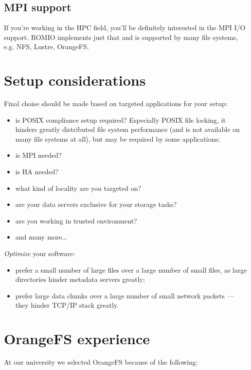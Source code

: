 \documentclass[10pt, a5paper]{article}
\begin{document}
{\subsection*{MPI support}

If you're working in the HPC\cite{bib9} field, you'll be definitely interested in the MPI\cite{bib13} I/O support. ROMIO\cite{bib14} implements just that and is supported by many file systems, e.g. NFS\cite{bib3}, Lustre\cite{bib10}, OrangeFS\cite{bib11}.

\section*{Setup considerations}

Final choise should be made based on targeted applications for your setup:

\begin{itemize}
  \item is POSIX compliance setup required? Especially POSIX file locking, it hinders greatly distributed file system performance (and is not available on many file systems at all), but may be required by some applications;
  \item is MPI\cite{bib13} needed?
  \item is HA needed?
  \item what kind of locality are you targeted on?
  \item are your data servers exclusive for your storage tasks?
  \item are you working in trusted environment?
  \item and many more\ldots{}
\end{itemize}

\emph{Optimize} your software:

\begin{itemize}
  \item prefer a small number of large files over a large number of small files, as large directories hinder metadata servers greatly;
  \item prefer large data chunks over a large number of small network packets — they hinder TCP/IP stack greatly.
\end{itemize}

\section*{OrangeFS experience}

At our university we selected OrangeFS because of the following:

}
\end{document}
